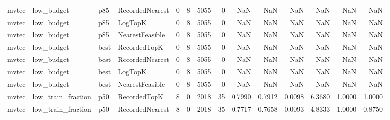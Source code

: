 \begin{tabular}{llllrrrrrrrrrr}
   mvtec &           low\_budget &    p85 & RecordedNearest &           0 &          8 &           5055 &                   0 &            NaN &             NaN &                       NaN &            NaN &                    NaN &                     NaN \\
   mvtec &           low\_budget &    p85 &         LogTopK &           0 &          8 &           5055 &                   0 &            NaN &             NaN &                       NaN &            NaN &                    NaN &                     NaN \\
   mvtec &           low\_budget &    p85 & NearestFeasible &           0 &          8 &           5055 &                   0 &            NaN &             NaN &                       NaN &            NaN &                    NaN &                     NaN \\
   mvtec &           low\_budget &   best &    RecordedTopK &           0 &          8 &           5055 &                   0 &            NaN &             NaN &                       NaN &            NaN &                    NaN &                     NaN \\
   mvtec &           low\_budget &   best & RecordedNearest &           0 &          8 &           5055 &                   0 &            NaN &             NaN &                       NaN &            NaN &                    NaN &                     NaN \\
   mvtec &           low\_budget &   best &         LogTopK &           0 &          8 &           5055 &                   0 &            NaN &             NaN &                       NaN &            NaN &                    NaN &                     NaN \\
   mvtec &           low\_budget &   best & NearestFeasible &           0 &          8 &           5055 &                   0 &            NaN &             NaN &                       NaN &            NaN &                    NaN &                     NaN \\
   mvtec &   low\_train\_fraction &    p50 &    RecordedTopK &           8 &          0 &           2018 &                  35 &         0.7990 &          0.7912 &                    0.0098 &         6.3680 &                 1.0000 &                  1.0000 \\
   mvtec &   low\_train\_fraction &    p50 & RecordedNearest &           8 &          0 &           2018 &                  35 &         0.7717 &          0.7658 &                    0.0093 &         4.8333 &                 1.0000 &                  0.8750 \\

\end{tabular}
